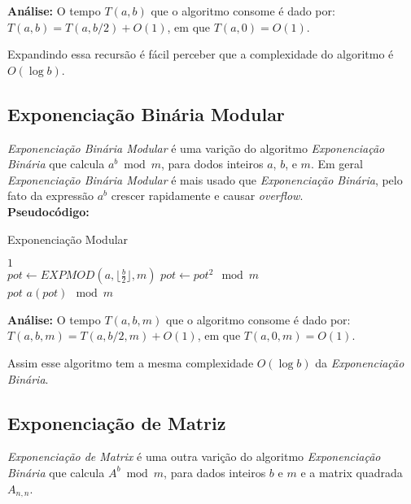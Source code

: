 \textbf{Análise:}
O tempo $T(a,b)$ que o algoritmo consome é dado por: $T(a,b) = T(a,b/2)+O(1)$, em que $T(a,0) = O(1)$.

Expandindo essa recursão é fácil perceber que a complexidade do algoritmo é $O(\log b)$.


\subsection{Exponenciação Binária Modular}

\textit{Exponenciação Binária Modular} é uma varição do algoritmo \textit{Exponenciação Binária} que calcula $a^b\bmod m$, para dodos inteiros $a$, $b$, e $m$. Em geral \textit{Exponenciação Binária Modular} é mais usado que \textit{Exponenciação Binária}, 
pelo fato da expressão $a^b$ crescer rapidamente e causar \textit{overflow}.\\

\textbf{Pseudocódigo:}
\begin{algorithm}
\caption{Exponenciação Modular}\label{exponenciacao_modular}
\begin{algorithmic}[1]
\State \Return $1$
\EndIf 
\\
\State $pot \gets EXPMOD(a, \lfloor \frac{b}{2} \rfloor, m)$
\State $pot \gets pot^2 \mod m$
\\
\State \Return $pot$
\Else
\State \Return $a(pot) \mod m$
\EndIf

\EndProcedure
\end{algorithmic}
\end{algorithm}


\textbf{Análise:}
O tempo $T(a,b,m)$ que o algoritmo consome é dado por: $T(a,b,m) = T(a,b/2,m)+O(1)$, em que $T(a,0,m) = O(1)$.

Assim esse algoritmo tem a mesma complexidade $O(\log b)$ da \textit{Exponenciação Binária}.

\subsection{Exponenciação de Matriz}

\textit{Exponenciação de Matrix} é uma outra varição do algoritmo \textit{Exponenciação Binária} que calcula $A^b\bmod m$, para dados inteiros $b$ e $m$ e a matrix quadrada $A_{n,n}$. 


